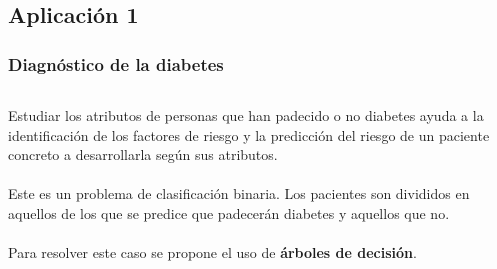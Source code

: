 \documentclass[8pt]{beamer}
\begin{document}
  \subsection{Aplicación 1}
    \begin{frame}
      \frametitle{Diagnóstico de la diabetes}
      \begin{columns}[T]
       \begin{column}{.5\textwidth}
	 \justifying
	 Estudiar los atributos de personas que han padecido o no diabetes ayuda a
         la identificación de los factores de riesgo y la
         predicción del riesgo de un paciente concreto a desarrollarla según sus atributos.
         \\~\\
         Este es un problema de clasificación binaria. Los pacientes son divididos en aquellos
         de los que se predice que padecerán diabetes y aquellos que no.
         \\~\\
         Para resolver este caso se propone el uso de \textbf{árboles de decisión}. 
         

\end{column}
\end{columns}
\end{frame}
\end{document}
